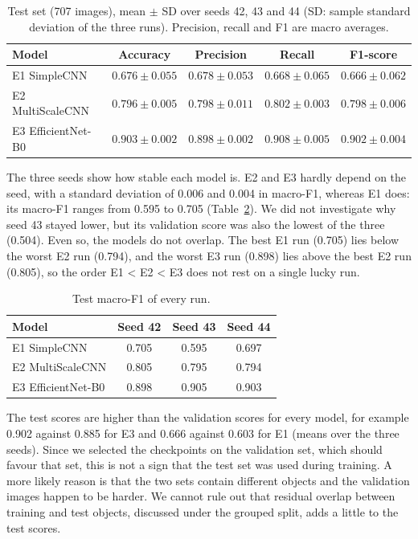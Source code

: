 \documentclass{article}
\begin{document}
\begin{table}[H]
\centering
\caption{Test set (707 images), mean $\pm$ SD over seeds 42, 43 and 44 (SD: sample standard deviation of the three runs). Precision, recall and F1 are macro averages.}
\label{tab:test}
\setlength{\tabcolsep}{4pt}
\begin{tabular}{lcccc}
\toprule
Model & Accuracy & Precision & Recall & F1-score \\
\midrule
E1 SimpleCNN & $0.676 \pm 0.055$ & $0.678 \pm 0.053$ & $0.668 \pm 0.065$ & $0.666 \pm 0.062$ \\
E2 MultiScaleCNN & $0.796 \pm 0.005$ & $0.798 \pm 0.011$ & $0.802 \pm 0.003$ & $0.798 \pm 0.006$ \\
E3 EfficientNet-B0 & $0.903 \pm 0.002$ & $0.898 \pm 0.002$ & $0.908 \pm 0.005$ & $0.902 \pm 0.004$ \\
\bottomrule
\end{tabular}
\end{table}

The three seeds show how stable each model is. E2 and E3 hardly depend on the seed, with a standard deviation of 0.006 and 0.004 in macro-F1, whereas E1 does: its macro-F1 ranges from 0.595 to 0.705 (Table~\ref{tab:seeds}). We did not investigate why seed 43 stayed lower, but its validation score was also the lowest of the three (0.504). Even so, the models do not overlap. The best E1 run (0.705) lies below the worst E2 run (0.794), and the worst E3 run (0.898) lies above the best E2 run (0.805), so the order E1 < E2 < E3 does not rest on a single lucky run.

\begin{table}[H]
\centering
\caption{Test macro-F1 of every run.}
\label{tab:seeds}
\begin{tabular}{lccc}
\toprule
Model & Seed 42 & Seed 43 & Seed 44 \\
\midrule
E1 SimpleCNN & 0.705 & 0.595 & 0.697 \\
E2 MultiScaleCNN & 0.805 & 0.795 & 0.794 \\
E3 EfficientNet-B0 & 0.898 & 0.905 & 0.903 \\
\bottomrule
\end{tabular}
\end{table}

The test scores are higher than the validation scores for every model, for example 0.902 against 0.885 for E3 and 0.666 against 0.603 for E1 (means over the three seeds). Since we selected the checkpoints on the validation set, which should favour that set, this is not a sign that the test set was used during training. A more likely reason is that the two sets contain different objects and the validation images happen to be harder. We cannot rule out that residual overlap between training and test objects, discussed under the grouped split, adds a little to the test scores.
\end{document}
